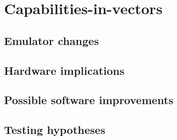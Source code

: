 \chapter{Capabilities-in-vectors}

\section{Emulator changes}

\section{Hardware implications}

\section{Possible software improvements}

\section{Testing hypotheses}

